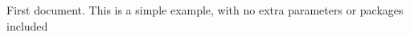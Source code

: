 \documentclass{article}
\begin{document}
First document. This is a simple example, with no 
extra parameters or packages included
\end{document}
